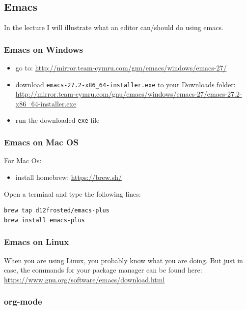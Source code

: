 \documentclass[11pt]{article}
\begin{document}
\subsection{Emacs}
\label{sec:org4503806}

In the lecture I will illustrate what an editor can/should do using emacs.


\subsubsection{Emacs on Windows}
\label{sec:org8cf15de}

\begin{itemize}
\item go to: \url{http://mirror.team-cymru.com/gnu/emacs/windows/emacs-27/}
\item download \texttt{emacs-27.2-x86\_64-installer.exe} to your Downloads folder: \url{http://mirror.team-cymru.com/gnu/emacs/windows/emacs-27/emacs-27.2-x86\_64-installer.exe}
\item run the downloaded \texttt{exe} file
\end{itemize}

\subsubsection{Emacs on Mac OS}
\label{sec:org675b8fa}

For Mac Os:
\begin{itemize}
\item install homebrew: \url{https://brew.sh/}
\end{itemize}

Open a terminal and type the following lines:

\begin{verbatim}
brew tap d12frosted/emacs-plus
brew install emacs-plus
\end{verbatim}

\subsubsection{Emacs on Linux}
\label{sec:org0a57834}

When you are using Linux, you probably know what you are doing. But just in case, the commands for your package manager can be found here: \url{https://www.gnu.org/software/emacs/download.html}


\subsubsection{org-mode}
\label{sec:org485afa5}
\end{document}
